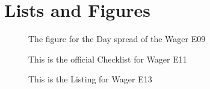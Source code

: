 \section{Lists and Figures}
\label{sec:ListFigures}



\begin{figure}

	
	\caption{The figure for the Day spread of the Wager E09} \label{fig:20 ways}
\end{figure}

\begin{figure}

\caption{This is the official Checklist for Wager E11} \label{fig:KamaSutra}
\end{figure}

\begin{figure}


\caption{This is the Listing for Wager E13} \label{fig:Roleplay}
\end{figure}